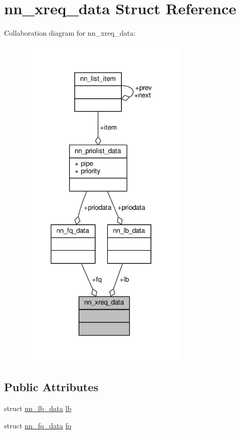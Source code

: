 \hypertarget{structnn__xreq__data}{}\section{nn\+\_\+xreq\+\_\+data Struct Reference}
\label{structnn__xreq__data}


Collaboration diagram for nn\+\_\+xreq\+\_\+data\+:\nopagebreak
\begin{figure}[H]
\begin{center}
\leavevmode
\includegraphics[width=229pt]{structnn__xreq__data__coll__graph}
\end{center}
\end{figure}
\subsection*{Public Attributes}
\begin{DoxyCompactItemize}
\item 
struct \hyperlink{structnn__lb__data}{nn\+\_\+lb\+\_\+data} \hyperlink{structnn__xreq__data_a2290d7fe793cdb2bd32c5d19092b361f}{lb}
\item 
struct \hyperlink{structnn__fq__data}{nn\+\_\+fq\+\_\+data} \hyperlink{structnn__xreq__data_a88b05a788b59690e65795136e63f4c9c}{fq}
\end{DoxyCompactItemize}


